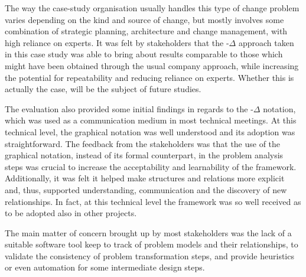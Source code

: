 \documentclass[runningheads,a4paper]{llncs}
\begin{document}
The way the case-study organisation usually handles this type of change problem varies depending on the kind and source of change, but mostly involves some combination of strategic planning, architecture and change management, with high reliance on experts. It was felt by stakeholders that the \POE{}-$\Delta$ approach taken in this case study was able to bring about results comparable to those which might have been obtained through the usual company approach, while increasing the potential for repeatability and reducing reliance on experts. Whether this is actually the case, will be the subject of future studies.

The evaluation also provided some initial findings in regards to the \POE{}-$\Delta$ notation, which was used as a communication medium in most technical meetings. At this technical level, the graphical notation was well understood and its adoption was straightforward. The feedback from the stakeholders was that the use of the graphical notation, instead of its formal counterpart, in the problem analysis steps was crucial to increase the acceptability and learnability of the framework. Additionally, it was felt it helped make structures and relations more explicit and, thus, supported understanding, communication and the discovery of new relationships. In fact, at this technical level the framework was so well received as to be adopted also in other projects. %
%


The main matter of concern brought up by most stakeholders was the lack of a suitable software tool keep to track of problem models and their relationships, to validate the consistency of problem transformation steps, and provide heuristics or even automation for some intermediate design steps. 
\end{document}
